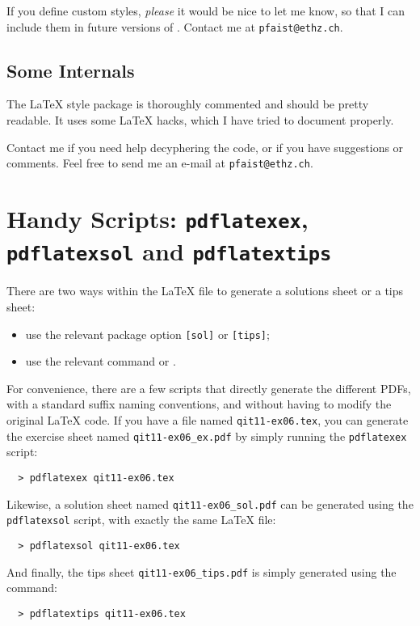 \documentclass[11pt,a4paper]{article}
\begin{document}
\begin{pkgnotice}
  If you define custom styles, \emph{please} it would be nice to let me know, so that I
  can include them in future versions of \ethuebung{}. Contact me at
  \texttt{pfaist{@}ethz.ch}.
\end{pkgnotice}






\subsection{Some Internals}
\label{sec:Internals}

The \LaTeX{} style package is thoroughly commented and should be pretty readable. It uses
some \LaTeX{} hacks, which I have tried to document properly.

Contact me if you need help decyphering the code, or if you have suggestions or
comments. Feel free to send me an e-mail at \texttt{pfaist{@}ethz.ch}.


\section{Handy Scripts: \texttt{pdflatexex}, \texttt{pdflatexsol} and \texttt{pdflatextips}}
\label{sec:handyscriptspdflatex}

There are two ways within the \LaTeX{} file to generate a solutions sheet or a tips sheet:
\begin{itemize}
\item use the relevant package option \texttt{[sol]} or \texttt{[tips]};
\item use the relevant command  or
  .
\end{itemize}

For convenience, there are a few scripts that directly generate the different PDFs, with a
standard suffix naming conventions, and without having to modify the original \LaTeX{}
code. If you have a file named \texttt{qit11-ex06.tex}, you can generate the exercise
sheet named \verb|qit11-ex06_ex.pdf| by simply running the \texttt{pdflatexex} script:
\begin{pkgverbatim}
\begin{verbatim}
  > pdflatexex qit11-ex06.tex
\end{verbatim}
\end{pkgverbatim}
Likewise, a solution sheet named \verb|qit11-ex06_sol.pdf| can be generated using the
\texttt{pdflatexsol} script, with exactly the same \LaTeX{} file:
\begin{pkgverbatim}
\begin{verbatim}
  > pdflatexsol qit11-ex06.tex
\end{verbatim}
\end{pkgverbatim}
And finally, the tips sheet \verb|qit11-ex06_tips.pdf| is simply generated using the
command:
\begin{pkgverbatim}
\begin{verbatim}
  > pdflatextips qit11-ex06.tex
\end{verbatim}
\end{pkgverbatim}
\end{document}

